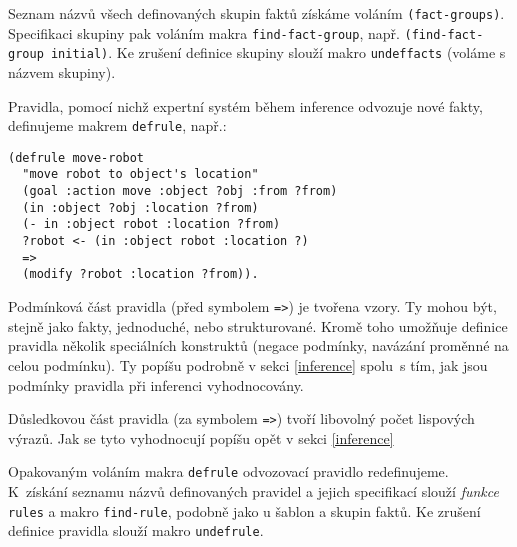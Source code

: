 Seznam názvů všech definovaných skupin faktů získáme voláním
\verb|(fact-groups)|. Specifikaci skupiny pak voláním makra
\verb|find-fact-group|, např. \verb|(find-fact-group initial)|. Ke zrušení
definice skupiny slouží makro \verb|undeffacts| (voláme s názvem skupiny).

Pravidla, pomocí nichž expertní systém během inference odvozuje nové fakty,
definujeme makrem
\verb|defrule|, např.:
\begin{verbatim}
(defrule move-robot
  "move robot to object's location"
  (goal :action move :object ?obj :from ?from)
  (in :object ?obj :location ?from)
  (- in :object robot :location ?from)
  ?robot <- (in :object robot :location ?)
  =>
  (modify ?robot :location ?from)).
\end{verbatim}
Podmínková část pravidla (před symbolem \verb|=>|) je tvořena vzory. Ty mohou
být, stejně jako fakty, jednoduché, nebo strukturované. Kromě toho umožňuje
definice pravidla několik speciálních konstruktů (negace podmínky, navázání
proměnné na celou podmínku). Ty popíšu podrobně v sekci \ref{inference} spolu~s
tím, jak jsou podmínky pravidla při inferenci vyhodnocovány.

Důsledkovou část pravidla (za symbolem \verb|=>|) tvoří libovolný počet
lispových výrazů. Jak se tyto vyhodnocují popíšu opět v sekci \ref{inference}

\FloatBarrier

Opakovaným voláním makra \verb|defrule| odvozovací pravidlo redefinujeme.
K~získání seznamu názvů definovaných pravidel a jejich specifikací slouží
\emph{funkce} \verb|rules| a makro \verb|find-rule|, podobně jako u šablon a
skupin faktů.  Ke zrušení definice pravidla slouží makro \verb|undefrule|.
